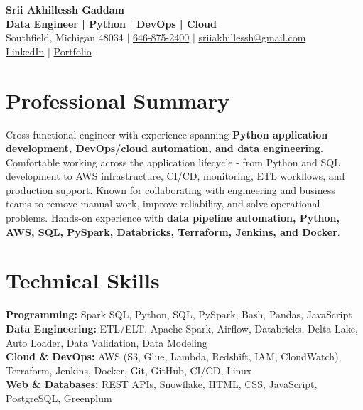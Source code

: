 \documentclass[letterpaper,10pt]{article}
\begin{document}
\fontsize{9.35pt}{10.45pt}\selectfont

\begin{center}
    {\LARGE \textbf{Srii Akhillessh Gaddam}} \\[-1pt]
    \textbf{Data Engineer | Python | DevOps | Cloud} \\[2pt]
    Southfield, Michigan 48034 $|$
    \href{tel:6468752400}{646-875-2400} $|$
    \href{mailto:sriiakhillessh@gmail.com}{sriiakhillessh@gmail.com} \\[1pt]
    \href{https://www.linkedin.com/in/srii-akhiilessh-gaddam-b48668191/}{LinkedIn} $|$
    \href{https://sriiakhillesshg.github.io/portfolio/}{Portfolio}
\end{center}
\vspace{-8pt}

\section{Professional Summary}
\small{Cross-functional engineer with experience spanning \textbf{Python application development, DevOps/cloud automation, and data engineering}. Comfortable working across the application lifecycle - from Python and SQL development to AWS infrastructure, CI/CD, monitoring, ETL workflows, and production support. Known for collaborating with engineering and business teams to remove manual work, improve reliability, and solve operational problems. Hands-on experience with \textbf{data pipeline automation, Python, AWS, SQL, PySpark, Databricks, Terraform, Jenkins, and Docker}.}

\section{Technical Skills}
\small{
\textbf{Programming:} Spark SQL, Python, SQL, PySpark, Bash, Pandas, JavaScript \\
\textbf{Data Engineering:} ETL/ELT, Apache Spark, Airflow, Databricks, Delta Lake, Auto Loader, Data Validation, Data Modeling \\
\textbf{Cloud \& DevOps:} AWS (S3, Glue, Lambda, Redshift, IAM, CloudWatch), Terraform, Jenkins, Docker, Git, GitHub, CI/CD, Linux \\
\textbf{Web \& Databases:} REST APIs, Snowflake, HTML, CSS, JavaScript, PostgreSQL, Greenplum
}

\end{document}
